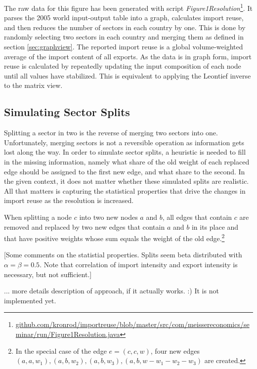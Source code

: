 \documentclass[english]{uzhpub}
\begin{document}
The raw data for this figure has been generated with script \emph{Figure1Resolution}\footnote{\href{https://github.com/kronrod/importreuse/blob/master/src/com/meissereconomics/seminar/run/Figure1Resolution.java}{github.com/kronrod/importreuse/blob/master/src/com/meissereconomics/seminar/run/Figure1Resolution.java}}. It parses the 2005 world input-output table into a graph, calculates import reuse, and then reduces the number of sectors in each country by one. This is done by randomly selecting two sectors in each country and merging them as defined in section \ref{sec:graphview}. The reported import reuse is a global volume-weighted average of the import content of all exports. As the data is in graph form, import reuse is calculated by repeatedly updating the input composition of each node until all values have stabilized. This is equivalent to applying the Leontief inverse to the matrix view.

\subsection{Simulating Sector Splits}
Splitting a sector in two is the reverse of merging two sectors into one. Unfortunately, merging sectors is not a reversible operation as information gets lost along the way. In order to simulate sector splits, a heuristic is needed to fill in the missing information, namely what share of the old weight of each replaced edge should be assigned to the first new edge, and what share to the second. In the given context, it does not matter whether these simulated splits are realistic. All that matters is capturing the statistical properties that drive the changes in import reuse as the resolution is increased.

When splitting a node $c$ into two new nodes $a$ and $b$, all edges that contain $c$ are removed and replaced by two new edges that contain $a$ and $b$ in its place and that have positive weights whose sum equals the weight of the old edge.\footnote{In the special case of the edge $e=(c, c, w)$, four new edges $(a, a, w_1), (a, b, w_2), (a, b, w_3), (a, b, w - w_1 - w_2 - w_3)$ are created.} 

[Some comments on the statistial properties. Splits seem beta distributed with $\alpha=\beta=0.5$. Note that correlation of import intensity and export intensity is necessary, but not sufficient.]

... more details description of approach, if it actually works. :) It is not implemented yet.
\end{document}
